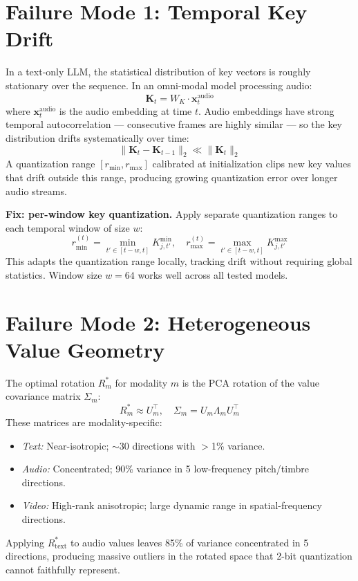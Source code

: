 \documentclass[10pt,twocolumn]{article}
\begin{document}
\section{Failure Mode 1: Temporal Key Drift}

In a text-only LLM, the statistical distribution of key vectors is
roughly stationary over the sequence. In an omni-modal model
processing audio:
\[
  \mathbf{K}_t = W_K \cdot \mathbf{x}_t^\text{audio}
\]
where $\mathbf{x}_t^\text{audio}$ is the audio embedding at time $t$.
Audio embeddings have strong temporal autocorrelation --- consecutive
frames are highly similar --- so the key distribution drifts
systematically over time:
\[
  \|\mathbf{K}_t - \mathbf{K}_{t-1}\|_2 \ll \|\mathbf{K}_t\|_2
\]
A quantization range $[r_\mathrm{min}, r_\mathrm{max}]$ calibrated at
initialization clips new key values that drift outside this range,
producing growing quantization error over longer audio streams.

\textbf{Fix: per-window key quantization.} Apply separate quantization
ranges to each temporal window of size $w$:
\[
  r_\mathrm{min}^{(t)} = \min_{t' \in [t-w,t]} K_{j,t'}^\mathrm{min},
  \quad
  r_\mathrm{max}^{(t)} = \max_{t' \in [t-w,t]} K_{j,t'}^\mathrm{max}
\]
This adapts the quantization range locally, tracking drift without
requiring global statistics. Window size $w = 64$ works well across
all tested models.

\section{Failure Mode 2: Heterogeneous Value Geometry}

The optimal rotation $R^*_m$ for modality $m$ is the PCA rotation of
the value covariance matrix $\Sigma_m$:
\[
  R^*_m \approx U_m^\top, \quad \Sigma_m = U_m \Lambda_m U_m^\top
\]
These matrices are modality-specific:
\begin{itemize}[itemsep=2pt,topsep=2pt]
  \item \textit{Text:} Near-isotropic; $\sim$30 directions with
    $>$1\% variance.
  \item \textit{Audio:} Concentrated; 90\% variance in 5 low-frequency
    pitch/timbre directions.
  \item \textit{Video:} High-rank anisotropic; large dynamic range in
    spatial-frequency directions.
\end{itemize}

Applying $R^*_\text{text}$ to audio values leaves 85\% of variance
concentrated in 5 directions, producing massive outliers in the
rotated space that 2-bit quantization cannot faithfully represent.
\end{document}
